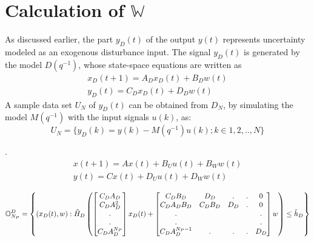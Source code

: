 \documentclass[letterpaper, 10 pt, conference]{ieeeconf}  %
\begin{document}
  \section{Calculation of $\mathbb{W}$}
  \noindent
  As discussed earlier, the part $y_D(t)$ of the output $y(t)$ represents uncertainty modeled as an exogenous disturbance input. The signal $y_D(t)$ is generated by the model $D(q^{-1})$, whose state-space equations are written as 
  \begin{equation}
  \begin{matrix}
  x_D(t+1) = A_Dx_D(t)+B_Dw(t)  \\
  y_D(t) = C_Dx_D(t)+D_Dw(t)
  \end{matrix}
  \label{ssD}
  \end{equation}
  A sample data set $U_N$ of $y_D(t)$ can be obtained from $D_N$, by simulating the model $M(q^{-1})$ with the input signals $u(k)$, as:
  \begin{equation}
  U_N=\{y_D(k)=y(k)-M(q^{-1})u(k);k \in 1,2,..,N\}
  \end{equation}

 {\color{red}{with the initial condition $x_M(0)=0$}}.
 \\
  \begin{equation}
  \begin{matrix}
  x(t+1)=Ax(t)+B_Uu(t)+B_Ww(t) \\
  y(t)=Cx(t)+D_Uu(t)+D_Ww(t) 
  \end{matrix} 
  \label{ssmodel_condensed}
  \end{equation}
  \begin{table}[t]
   \begin{equation}
   \small
   \mathbb{O}_{N_P}^D=\begin{Bmatrix}(x_D(t),w):\tilde{H}_D\begin{pmatrix}\begin{bmatrix} C_DA_D\\ C_DA_D^2 \\ . \\ . \\ C_DA_D^{N_P}\end{bmatrix}x_D(t) + \begin{bmatrix}
   C_DB_D & D_D & . & . & 0 \\
   C_DA_DB_D & C_DB_D & D_D & . & 0 \\
   . &  &  &  & . \\
   . &  &  &  & . \\
   C_DA_D^{N_P-1} & . & . & . & D_D
   \end{bmatrix}w\end{pmatrix} \leq \tilde{h}_D
   \end{Bmatrix}
   \label{OND_set}
   \end{equation} 
  \end{table}
\end{document}
